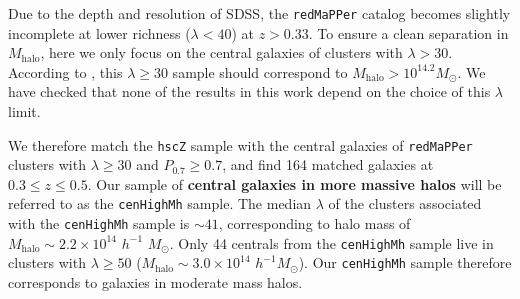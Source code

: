 \documentclass[a4paper,fleqn,usenatbib]{mnras}
\def\arcsec{{\prime\prime}}
\def\redm{\texttt{redMaPPer}}
\def\rbcg{\texttt{cenHighMh}}
\def\mhalo{{$M_{\mathrm{halo}}$}}
\def\logms{{$\log (M_{\star}/M_{\odot})$}}
\def\logmh{{$\log (M_{\mathrm{halo}}/M_{\odot})$}}
\begin{document}

    
    
    Due to the depth and resolution of SDSS, the \redm{} catalog becomes slightly 
    incomplete at lower richness ($\lambda < 40$) at $z > 0.33$. 
    To ensure a clean separation in \mhalo{}, here we only focus on the central 
    galaxies of clusters with $\lambda > 30$. 
    According to \citet{Simet2016}, this $\lambda \geq 30$ sample should correspond to 
    $M_{\mathrm{halo}}>10^{14.2} M_{\odot}$. 
    We have checked that none of the results in this work depend on the choice of this 
    $\lambda$ limit.
    
    We therefore match the \texttt{hscZ} sample with the central galaxies of \redm{} clusters 
    with $\lambda \geq 30$ and $P_{\mathrm{0.7}} \geq 0.7$, and find 164 matched 
    galaxies at $0.3 \leq z \leq 0.5$.
    Our sample of \textbf{central galaxies in more massive halos} will be referred to 
    as the \rbcg{} sample. 
    The median $\lambda$ of the clusters associated with the \rbcg{} sample is 
    ${\sim} 41$, corresponding to halo mass of 
    $M_{\mathrm{halo}}{\sim} 2.2\times 10^{14}$ $h^{-1}$ $M_{\odot}$.
    Only 44 centrals from the \rbcg{} sample live in clusters with $\lambda \geq 50$
    ($M_{\mathrm{halo}} {\sim} 3.0\times 10^{14}$ $h^{-1} M_{\odot}$). 
    Our \rbcg{} sample therefore corresponds to galaxies in moderate mass halos.
    
\end{document}

